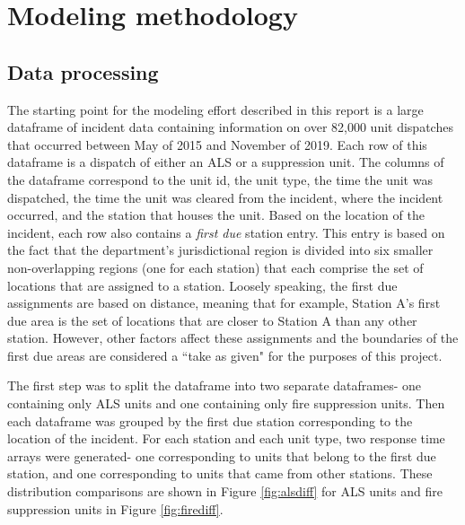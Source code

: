 \documentclass[article]{proc}
\begin{document}
\section{Modeling methodology}
\subsection{Data processing}
The starting point for the modeling effort described in this report is a large dataframe of incident data containing information on over 82,000 unit dispatches that occurred between May of 2015 and November of 2019. Each row of this dataframe is a dispatch of either an ALS or a suppression unit. The columns of the dataframe correspond to the unit id, the unit type, the time the unit was dispatched, the time the unit was cleared from the incident, where the incident occurred, and the station that houses the unit. Based on the location of the incident, each row also contains a \textit{first due} station entry. This entry is based on the fact that the department's jurisdictional region is divided into six smaller non-overlapping regions (one for each station) that each comprise the set of locations that are assigned to a station. Loosely speaking, the first due assignments are based on distance, meaning that for example, Station A's first due area is the set of locations that are closer to Station A than any other station. However, other factors affect these assignments and the boundaries of the first due areas are considered a ``take as given" for the purposes of this project.


The first step was to split the dataframe into two separate dataframes- one containing only ALS units and one containing only fire suppression units. Then each dataframe was grouped by the first due station corresponding to the location of the incident. For each station and each unit type, two response time arrays were generated- one corresponding to units that belong to the first due station, and one corresponding to units that came from other stations. These distribution comparisons are shown in Figure \ref{fig:alsdiff} for ALS units and fire suppression units in Figure \ref{fig:firediff}.
\end{document}
